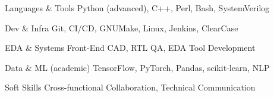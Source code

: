 \documentclass[10pt]{article}
\begin{document}
\begin{compactdesc}

    \item[Languages \& Tools] Python (advanced), C++, Perl, Bash, SystemVerilog  
    \item[Dev \& Infra] Git, CI/CD, GNUMake, Linux, Jenkins, ClearCase  
    \item[EDA \& Systems] Front-End CAD, RTL QA, EDA Tool Development  
    \item[Data \& ML (academic)] TensorFlow, PyTorch, Pandas, scikit-learn, NLP  
    \item[Soft Skills] Cross-functional Collaboration, Technical Communication


\end{compactdesc}
\end{document}
